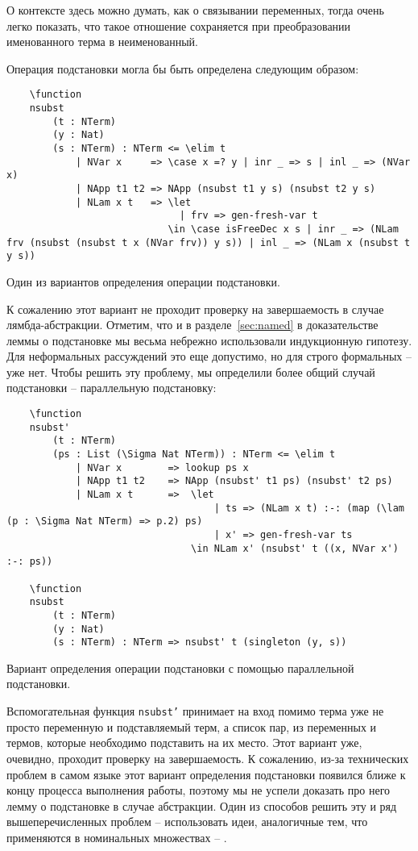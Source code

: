О контексте здесь можно думать, как о связывании переменных, тогда очень легко показать, что такое отношение сохраняется при преобразовании именованного терма в неименованный.

Операция подстановки могла бы быть определена следующим образом:
\begin{listing}[H]
  \begin{verbatim}
    \function
    nsubst
        (t : NTerm)
        (y : Nat)
        (s : NTerm) : NTerm <= \elim t
            | NVar x     => \case x =? y | inr _ => s | inl _ => (NVar x)
            | NApp t1 t2 => NApp (nsubst t1 y s) (nsubst t2 y s)
            | NLam x t   => \let
                              | frv => gen-fresh-var t
                            \in \case isFreeDec x s | inr _ => (NLam frv (nsubst (nsubst t x (NVar frv)) y s)) | inl _ => (NLam x (nsubst t y s))
  \end{verbatim}
  \caption{Один из вариантов определения операции подстановки.}
\end{listing}

К сожалению этот вариант не проходит проверку на завершаемость в случае лямбда-абстракции. Отметим, что и в разделе~\ref{sec:named} в доказательстве леммы о подстановке мы весьма небрежно использовали индукционную гипотезу. Для неформальных рассуждений это еще допустимо, но для строго формальных -- уже нет. Чтобы решить эту проблему, мы определили более общий случай подстановки -- параллельную подстановку:

\begin{listing}[h]
  \begin{verbatim}
    \function
    nsubst'
        (t : NTerm)
        (ps : List (\Sigma Nat NTerm)) : NTerm <= \elim t
            | NVar x        => lookup ps x
            | NApp t1 t2    => NApp (nsubst' t1 ps) (nsubst' t2 ps)
            | NLam x t      =>  \let
                                    | ts => (NLam x t) :-: (map (\lam (p : \Sigma Nat NTerm) => p.2) ps)
                                    | x' => gen-fresh-var ts
                                \in NLam x' (nsubst' t ((x, NVar x') :-: ps))

    \function
    nsubst
        (t : NTerm)
        (y : Nat)
        (s : NTerm) : NTerm => nsubst' t (singleton (y, s))
  \end{verbatim}
  \label{listing:parallel-subst}
  \caption{Вариант определения операции подстановки с помощью параллельной подстановки.}
\end{listing}

Вспомогательная функция \texttt{nsubst'} принимает на вход помимо терма уже не просто переменную и подставляемый терм, а список пар, из переменных и термов, которые необходимо подставить на их место. Этот вариант уже, очевидно, проходит проверку на завершаемость. К сожалению, из-за технических проблем в самом языке этот вариант определения подстановки появился ближе к концу процесса выполнения работы, поэтому мы не успели доказать про него лемму о подстановке в случае абстракции. Один из способов решить эту и ряд вышеперечисленных проблем -- использовать идеи, аналогичные тем, что применяются в номинальных множествах -- \cite{pitts2013nominal}.
